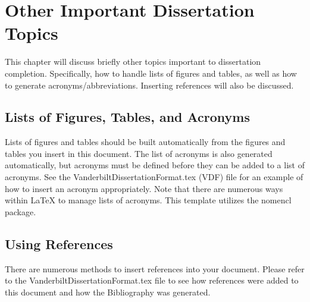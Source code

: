 \documentclass[10pt]{report}  %
\begin{document}
\chapter{Other Important Dissertation Topics}
This chapter will discuss briefly other topics important to dissertation completion. Specifically, how to handle lists of figures and tables, as well as how to generate acronyms/abbreviations. Inserting references will also be discussed.

\section{ Lists of Figures, Tables, and Acronyms}
Lists of figures and tables should be built automatically from the figures and tables you insert in this document. The list of acronyms is also generated automatically, but acronyms must be defined before they can be added to a list of acronyms. See the  VanderbiltDissertationFormat.tex (VDF) file for an example of how to insert an acronym appropriately. Note that there are numerous ways within LaTeX to manage lists of acronyms. This template utilizes the nomencl package.

\section{Using References}
There are numerous methods to insert references into your document. Please refer to the VanderbiltDissertationFormat.tex file to see how references were added to this document and how the Bibliography was generated.

\singlespacing


\end{document}
